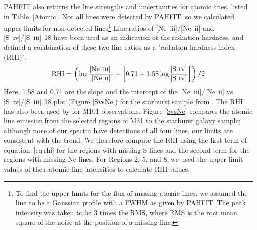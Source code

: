 PAHFIT also returns the line strengths and uncertainties for atomic lines, listed in Table~\ref{Atomic}.
Not all lines were detected by PAHFIT, so we calculated upper limits for non-detected lines\footnote{To find 
the upper limits for the flux of missing atomic lines, we assumed the line to be a 
Gaussian profile with a FWHM as given by PAHFIT. The peak intensity was taken to be 3 times the RMS, where RMS is the root mean square of 
the noise at the position of a missing line.}
Line ratios of [Ne~{\sc iii}]/[Ne~{\sc ii}] and [S~{\sc iv}]/[S~{\sc iii}]~18 have been used as an indication of the radiation hardness, and
\citet{Engelbracht_2008} defined a combination of these two line ratios as a 'radiation hardness index (RHI)':
%
\begin{equation}
{\rm RHI} = \left( \log\frac{\textrm{[Ne~{\sc iii}] }}{\textrm{[Ne~{\sc ii}]}} + \left[0.71 + 1.58\log\frac{\textrm{{[S~{\sc iv}]}}}{\textrm{{[S~{\sc iv}]}}}\right]\right) /2
\end{equation}
\label{eq:rhi}
%
Here, 1.58 and 0.71 are the slope and the intercept of the [Ne~{\sc iii}]/[Ne~{\sc ii}]  vs [S~{\sc iv}]/[S~{\sc iii}]~18 plot (Figure \ref{SvsNe}) for the starburst sample from 
\citet{Engelbracht_2008}. The RHI has also been used by \citet{Gordon:2008lr} for M101 observations. 
Figure \ref{SvsNe}  compares the atomic line emission from the selected regions of M31 to the starburst galaxy sample;
although none of our spectra have detections of all four lines, our limits are consistent with the trend.
We therefore compute the RHI using the first term of equation~\ref{eq:rhi} for the regions with missing S lines
and the second term for the regions with missing Ne lines.
For Regions 2, 5, and 8, we used the upper limit values of their atomic line intensities to calculate RHI values.
